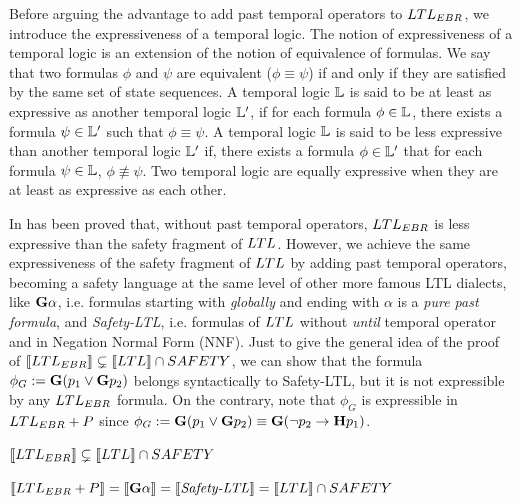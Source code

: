 Before arguing the advantage to add past temporal operators to $LTL_{EBR}$, we introduce the expressiveness of a temporal logic.
The notion of expressiveness of a temporal logic is an extension of the notion of equivalence of formulas.
We say that two formulas $\phi$ and $\psi$ are equivalent ($\phi \equiv \psi$) if and only if they are satisfied by the same set of state sequences.
A temporal logic $\mathbb{L}$ is said to be at least as expressive as another temporal logic $\mathbb{L}'$, if for each formula $\phi \in \mathbb{L}$, there exists a formula $\psi \in \mathbb{L}'$ such that $\phi \equiv \psi$.
A temporal logic $\mathbb{L}$ is said to be less expressive than another temporal logic $\mathbb{L}'$ if, there exists a formula $\phi \in \mathbb{L}'$ that for each formula $\psi \in \mathbb{L}$, $\phi \not\equiv \psi$.
Two temporal logic are equally expressive when they are at least as expressive as each other.

In \cite{geatti-2021-09} has been proved that, without past temporal operators, $LTL_{EBR}$ is less expressive than the safety fragment of $LTL$. However, we achieve the same expressiveness of the safety fragment of $LTL$ by adding past temporal operators, becoming a safety language at the same level of other more famous LTL dialects, like $\mathbf{G} \alpha$, i.e. formulas starting with \textit{globally} and ending with $\alpha$ is a \textit{pure past formula}, and \textit{Safety-LTL}, i.e. formulas of $LTL$ without \textit{until} temporal operator and in Negation Normal Form (NNF).
Just to give the general idea of the proof of $\llbracket LTL_{EBR} \rrbracket \subsetneq \llbracket LTL \rrbracket \cap SAFETY$, we can show that the formula $\phi_G := \mathbf{G} (p_1 \lor \mathbf{G} p_2)$ belongs syntactically to Safety-LTL, but it is not expressible by any $LTL_{EBR}$ formula. On the contrary, note that $\phi_G$ is expressible in $LTL_{EBR}+P$ since $\phi_G := \mathbf{G} (p_1 \lor \mathbf{G} p_2) \equiv \mathbf{G} (\neg p_2 \to \mathbf{H} p_1)$.

\begin{theorem}
$\llbracket LTL_{EBR} \rrbracket \subsetneq \llbracket LTL \rrbracket \cap SAFETY$
\end{theorem}

\begin{theorem}
$\llbracket LTL_{EBR}+P \rrbracket = \llbracket \mathbf{G} \alpha \rrbracket = \llbracket \text{\textit{Safety-LTL}} \rrbracket =  \llbracket LTL \rrbracket \cap SAFETY$
\end{theorem}

